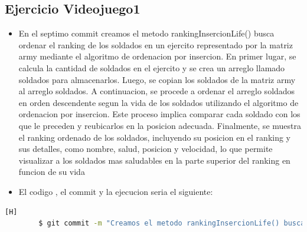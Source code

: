 \documentclass{article}
\begin{document}
	\subsection{Ejercicio Videojuego1}
	\begin{itemize}	
		\item En el septimo commit creamos el metodo rankingInsercionLife() busca ordenar el ranking de los soldados en un ejercito representado por la matriz army mediante el algoritmo de ordenacion por insercion. En primer lugar, se calcula la cantidad de soldados en el ejercito y se crea un arreglo llamado soldados para almacenarlos. Luego, se copian los soldados de la matriz army al arreglo soldados. A continuacion, se procede a ordenar el arreglo soldados en orden descendente segun la vida de los soldados utilizando el algoritmo de ordenacion por insercion. Este proceso implica comparar cada soldado con los que le preceden y reubicarlos en la posicion adecuada. Finalmente, se muestra el ranking ordenado de los soldados, incluyendo su posicion en el ranking y sus detalles, como nombre, salud, posicion y velocidad, lo que permite visualizar a los soldados mas saludables en la parte superior del ranking en funcion de su vida
		\item El codigo , el commit y la ejecucion seria el siguiente:
	\end{itemize}	
	\begin{lstlisting}[language=bash,caption={Commit}][H]
		$ git commit -m "Creamos el metodo rankingInsercionLife() busca ordenar el ranking de los soldados en un ejercito representado por la matriz army mediante el algoritmo de ordenacion por insercion. En primer lugar, se calcula la cantidad de soldados en el ejercito y se crea un arreglo llamado soldados para almacenarlos. Luego, se copian los soldados de la matriz army al arreglo soldados. A continuacion, se procede a ordenar el arreglo soldados en orden descendente segun la vida de los soldados utilizando el algoritmo de ordenacion por insercion. Este proceso implica comparar cada soldado con los que le preceden y reubicarlos en la posicion adecuada. Finalmente, se muestra el ranking ordenado de los soldados, incluyendo su posicion en el ranking y sus detalles, como nombre, salud, posicion y velocidad, lo que permite visualizar a los soldados mas saludables en la parte superior del ranking en funcion de su vida"
	\end{lstlisting}	
\end{document}
